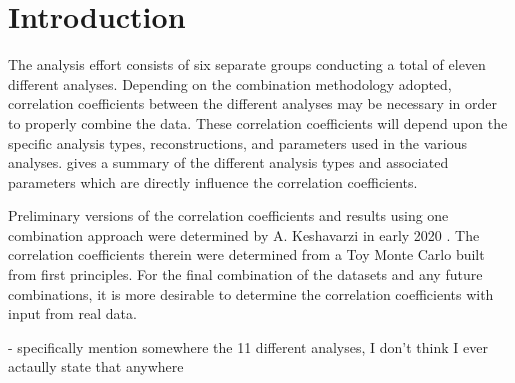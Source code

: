 
\graphicspath{{Body/Figures/}}

\section{Introduction}

The \Rone \wa analysis effort consists of six separate groups conducting a total of eleven different analyses. Depending on the combination methodology adopted, correlation coefficients between the different analyses may be necessary in order to properly combine the data. These correlation coefficients will depend upon the specific analysis types, reconstructions, and parameters used in the various analyses.  gives a summary of the different analysis types and associated parameters which are directly influence the correlation coefficients. 

Preliminary versions of the correlation coefficients and results using one combination approach were determined by A. Keshavarzi in early 2020 \cite{AlexCombinationNote}. The correlation coefficients therein were determined from a Toy Monte Carlo built from first principles. For the final combination of the \Rone datasets and any future combinations, it is more desirable to determine the correlation coefficients with input from real data. 



- specifically mention somewhere the 11 different analyses, I don't think I ever actaully state that anywhere


